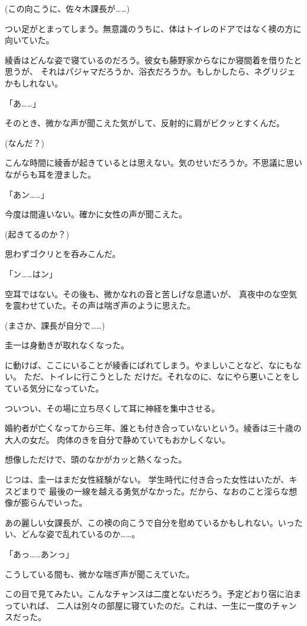 ﻿\documentclass[
    book,tate,
    line_length=30zw,
    jafontsize=12pt,
    paper=b5j,
    landscape,
    ]{jlreq}
\begin{document}
(この向こうに、佐々木課長が……)

つい足がとまってしまう。無意識のうちに、体はトイレのドアではなく襖の方に向いていた。

綾香はどんな姿で寝ているのだろう。彼女も藤野家からなにか寝間着を借りたと思うが、
それはパジャマだろうか、浴衣だろうか。もしかしたら、ネグリジェかもしれない。

「あ……」

そのとき、微かな声が聞こえた気がして、反射的に肩がビクッとすくんだ。

(なんだ？)

こんな時間に綾香が起きているとは思えない。気のせいだろうか。不思議に思いながらも耳を澄ました。

「あン……」

今度は間違いない。確かに女性の声が聞こえた。

(起きてるのか？)

思わずゴクリとを呑みこんだ。

「ン……はン」

空耳ではない。その後も、微かなれの音と苦しげな息遣いが、
真夜中のな空気を震わせていた。その声は喘ぎ声のように思えた。

(まさか、課長が自分で……)

圭一は身動きが取れなくなった。

に動けば、ここにいることが綾香にばれてしまう。やましいことなど、なにもない。
ただ、トイレに行こうとした だけだ。それなのに、なにやら悪いことをしている気分になっていた。

ついつい、その場に立ち尽くして耳に神経を集中させる。

婚約者が亡くなってから三年、誰とも付き合っていないという。綾香は三十歳の大人の女だ。
肉体のきを自分で静めていてもおかしくない。

想像しただけで、頭のなかがカッと熱くなった。

じつは、圭一はまだ女性経験がない。 学生時代に付き合った女性はいたが、キスどまりで
最後の一線を越える勇気がなかった。だから、なおのこと淫らな想像が膨らんでいった。

あの麗しい女課長が、この襖の向こうで自分を慰めているかもしれない。いったい、どんな姿で乱れているのか……。

「あっ……あンっ」

こうしている間も、微かな喘ぎ声が聞こえていた。

この目で見てみたい。こんなチャンスは二度とないだろう。予定どおり宿に泊まっていれば、
二人は別々の部屋に寝ていたのだ。これは、一生に一度のチャンスだった。
\end{document}
